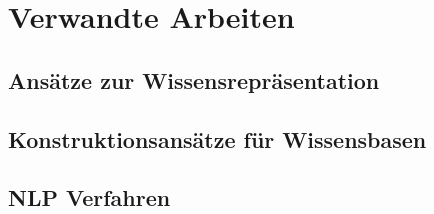%
\chapter{Verwandte Arbeiten}
\label{sec:related}

\section{Ansätze zur Wissensrepräsentation}
\label{sec:related:knowledge-representation}

\section{Konstruktionsansätze für Wissensbasen}
\label{sec:related:knowledge-base-construction}

\section{NLP Verfahren}
\label{sec:related:nlp}
